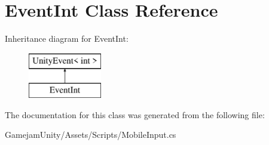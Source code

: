 \hypertarget{class_event_int}{}\section{Event\+Int Class Reference}
\label{class_event_int}
Inheritance diagram for Event\+Int\+:\begin{figure}[H]
\begin{center}
\leavevmode
\includegraphics[height=2.000000cm]{class_event_int}
\end{center}
\end{figure}


The documentation for this class was generated from the following file\+:\begin{DoxyCompactItemize}
\item 
Gamejam\+Unity/\+Assets/\+Scripts/Mobile\+Input.\+cs\end{DoxyCompactItemize}
